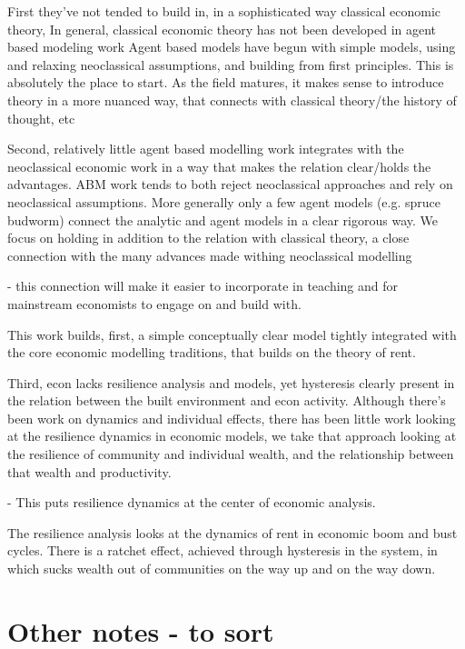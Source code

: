 {First they've not tended to build in, in a sophisticated way classical economic theory,
In general, classical economic theory has not been developed in agent based modeling work
Agent based models have begun with simple models, using and relaxing neoclassical assumptions, and building from first principles. This is absolutely the place to start. As the field matures, it makes sense to introduce theory in a more nuanced way, that connects with classical theory/the history of thought, etc

Second, relatively little agent based modelling work integrates with the neoclassical economic work in a way that makes the relation clear/holds the advantages. ABM work tends to both reject neoclassical approaches and rely on neoclassical assumptions.
More generally only a few agent models (e.g. spruce budworm) connect the analytic and agent models in a clear rigorous way. We focus on holding in addition to the relation with classical theory, a close connection with the many advances made withing neoclassical modelling

- this connection will make it easier to incorporate in teaching and for mainstream economists to engage on and build with.

This work builds, first, a simple conceptually clear model tightly integrated with the core economic modelling traditions, that builds on the theory of rent.


Third, econ lacks resilience analysis and models, yet hysteresis clearly present in the relation between the built environment and econ activity. Although there's been work on dynamics and individual effects, there has been little work looking at the resilience dynamics in economic models, we take that approach looking at the resilience of community and individual wealth, and the relationship between that wealth and productivity. 

- This puts resilience dynamics at the center of economic analysis.

The resilience analysis looks at the dynamics of rent in economic boom and bust cycles.
There is a ratchet effect, achieved through hysteresis in the system, in which sucks wealth out of communities on the way up and on the way down. %


\section{Other notes - to sort}

}
